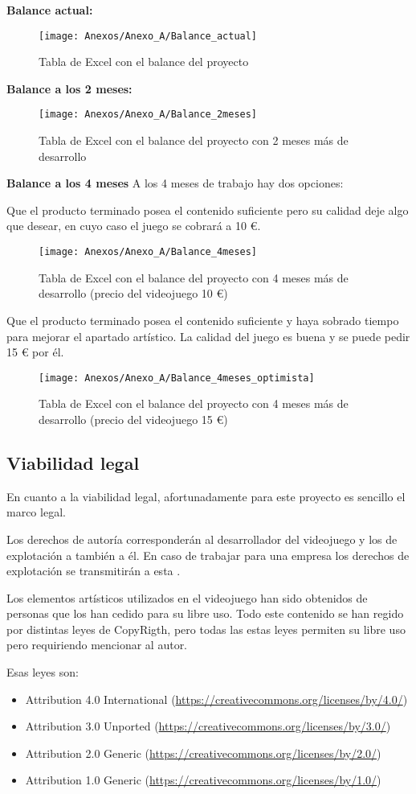 \textbf{Balance actual:}
\begin{figure}[h]
\centering
\texttt{[image: Anexos/Anexo\_A/Balance\_actual]}
\caption{Tabla de Excel con el balance del proyecto}
\end{figure}

\textbf{Balance a los 2 meses:}
\begin{figure}[h]
\centering
\texttt{[image: Anexos/Anexo\_A/Balance\_2meses]}
\caption{Tabla de Excel con el balance del proyecto con 2 meses más de desarrollo}
\end{figure}

\textbf{Balance a los 4 meses}
A los 4 meses de trabajo hay dos opciones:

Que el producto terminado posea el contenido suficiente pero su calidad deje algo que desear, en cuyo caso el juego se cobrará a 10 €.

\clearpage
\begin{figure}[h]
\centering
\texttt{[image: Anexos/Anexo\_A/Balance\_4meses]}
\caption{Tabla de Excel con el balance del proyecto con 4 meses más de desarrollo (precio del videojuego 10 €)}
\end{figure}

Que el producto terminado posea el contenido suficiente y haya sobrado tiempo para mejorar el apartado artístico. La calidad del juego es buena y se puede pedir 15 € por él.
\begin{figure}[h]
\centering
\texttt{[image: Anexos/Anexo\_A/Balance\_4meses\_optimista]}
\caption{Tabla de Excel con el balance del proyecto con 4 meses más de desarrollo (precio del videojuego 15 €)}
\end{figure}

\subsection{Viabilidad legal}
En cuanto a la viabilidad legal, afortunadamente para este proyecto es sencillo el marco legal.

Los derechos de autoría corresponderán al desarrollador del videojuego y los de explotación a también a él. En caso de trabajar para una empresa los derechos de explotación se transmitirán a esta \cite{PropiedadIntelectual}.

Los elementos artísticos utilizados en el videojuego han sido obtenidos de personas que los han cedido para su libre uso. Todo este contenido se han regido por distintas leyes de CopyRigth, pero todas las estas leyes permiten su libre uso pero requiriendo mencionar al autor.

\clearpage
Esas leyes son:
\begin{itemize}
\item
Attribution 4.0 International (\url{https://creativecommons.org/licenses/by/4.0/})
\item
Attribution 3.0 Unported (\url{https://creativecommons.org/licenses/by/3.0/})
\item
Attribution 2.0 Generic (\url{https://creativecommons.org/licenses/by/2.0/})
\item
Attribution 1.0 Generic (\url{https://creativecommons.org/licenses/by/1.0/})
\end{itemize}